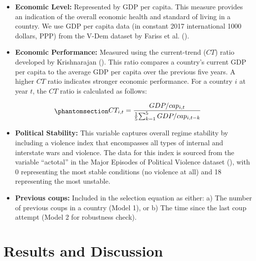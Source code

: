 \documentclass[
  12pt,
]{report}
\providecommand{\tightlist}{%
  \setlength{\itemsep}{0pt}\setlength{\parskip}{0pt}}\usepackage{longtable,booktabs,array}
\begin{document}
\begin{itemize}
\tightlist
\item
  \textbf{Economic Level:} Represented by GDP per capita. This measure
  provides an indication of the overall economic health and standard of
  living in a country. We use GDP per capita data (in constant 2017
  international 1000 dollars, PPP) from the V-Dem dataset by Fariss et
  al. ().
\item
  \textbf{Economic Performance:} Measured using the current-trend
  (\(CT\)) ratio developed by Krishnarajan
  (). This ratio compares a
  country's current GDP per capita to the average GDP per capita over
  the previous five years. A higher \(CT\) ratio indicates stronger
  economic performance. For a country \(i\) at year \(t\), the \(CT\)
  ratio is calculated as follows:
\end{itemize}

\begin{equation}\phantomsection\label{eq-eq6}{
    \begin{aligned}
    CT_{i,t} = {GDP/cap_{i,t} \over {1 \over 5} {\sum_{k=1}^5GDP/cap_{i,t-k}}}
    \end{aligned}
}\end{equation}

\begin{itemize}
\tightlist
\item
  \textbf{Political Stability:} This variable captures overall regime
  stability by including a violence index that encompasses all types of
  internal and interstate wars and violence. The data for this index is
  sourced from the variable ``actotal'' in the Major Episodes of
  Political Violence dataset
  (), with 0
  representing the most stable conditions (no violence at all) and 18
  representing the most unstable.
\item
  \textbf{Previous coups:} Included in the selection equation as either:
  a) The number of previous coups in a country (Model 1), or b) The time
  since the last coup attempt (Model 2 for robustness check).
\end{itemize}

\section{Results and Discussion}\label{results-and-discussion}
\end{document}
